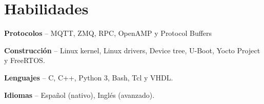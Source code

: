 \section{Habilidades}
\begin{small}
	\parbox[t][][t]{\linewidth}{
		\textbf{Protocolos} -- {MQTT, ZMQ, RPC, OpenAMP y Protocol Buffers}
		\bigbreak
	}
	\parbox[t][][t]{\linewidth}{
		\textbf{Construcción} -- {Linux kernel, Linux drivers, Device tree, U-Boot, Yocto Project y FreeRTOS.}
		\bigbreak
	}
	\parbox[t][][t]{\linewidth}{
		\textbf{Lenguajes} -- {C, C++, Python 3, Bash, Tcl y VHDL.}
		\bigbreak
	}
	\parbox[t][][t]{\linewidth}{
		\textbf{Idiomas} -- {Español (nativo), Inglés (avanzado).}
		\bigbreak
	}
\end{small}
